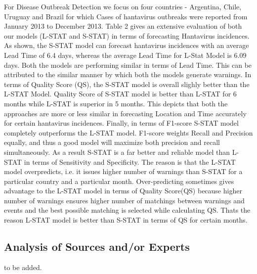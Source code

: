\documentclass[conference]{IEEEtran}
\begin{document}
For Disease Outbreak Detection we focus on four countries - Argentina,
Chile, Uruguay and Brazil for which Cases of hantavirus outbreaks were reported
from January 2013 to December 2013. Table 2 gives an
extensive evaluation of both our models (L-STAT and S-STAT) in terms of
forecasting Hantavirus incidences. As shown, the S-STAT model can
forecast hantavirus incidences with an average Lead Time of 6.4 days,
whereas the average Lead Time for L-Stat Model is 6.09 days. Both the
models are performing similar in terms of Lead Time. This can be
attributed to the similar manner by which both the models generate
warnings. In terms of Quality Score (QS), the S-STAT model is overall slighly
better than the L-STAT Model. Quality Score of S-STAT model is better than L-STAT for 6
months while L-STAT is superior in 5 months. This depicts that both the
approaches are more or less similar in forecasting Location and Time
accurately for certain hantavirus incidences. Finally, in terms of
F1-score S-STAT model completely outperforms the L-STAT model. F1-score
weights Recall and Precision equally, and thus a good model will
maximize both precision and recall simultaneously. As a result S-STAT is
a far better and reliable model than L-STAT in terms of Sensitivity and
Specificity. The reason is that the L-STAT model overpredicts, i.e. it
issues higher number of warnings than S-STAT for a particular country and  
a particular month. Over-predicting sometimes gives
advantage to the L-STAT model in terms of Quality Score(QS) because
higher number of warnings ensures higher number of matchings between
warnings and events and the best possible matching is selected while
calculating QS. Thats the reason L-STAT model is better than S-STAT in
terms of QS for certain months.


\subsection{Analysis of Sources and/or Experts}

to be added.

%
\end{document}
